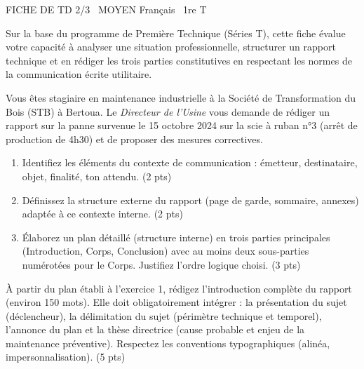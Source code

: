 \documentclass[11pt]{article}
\begin{document}
\begin{tcolorbox}[enhanced,colback=popink,colframe=popink,arc=10pt,boxrule=0pt,left=12pt,right=12pt,top=9pt,bottom=9pt]
{\color{white}\popxbold\small FICHE DE TD 2/3 \textbullet\ MOYEN \hfill Français \textbullet\ 1re T\par}
\end{tcolorbox}
\vspace{4pt}
\noindent Sur la base du programme de Première Technique (Séries T), cette fiche évalue votre capacité à analyser une situation professionnelle, structurer un rapport technique et en rédiger les trois parties constitutives en respectant les normes de la communication écrite utilitaire.

\begin{exercice}
Vous êtes stagiaire en maintenance industrielle à la Société de Transformation du Bois (STB) à Bertoua. Le \textit{Directeur de l'Usine} vous demande de rédiger un rapport sur la panne survenue le 15 octobre 2024 sur la scie à ruban n°3 (arrêt de production de 4h30) et de proposer des mesures correctives.
\begin{enumerate}
    \item Identifiez les éléments du contexte de communication : émetteur, destinataire, objet, finalité, ton attendu. (2 pts)
    \item Définissez la structure externe du rapport (page de garde, sommaire, annexes) adaptée à ce contexte interne. (2 pts)
    \item Élaborez un plan détaillé (structure interne) en trois parties principales (Introduction, Corps, Conclusion) avec au moins deux sous-parties numérotées pour le Corps. Justifiez l'ordre logique choisi. (3 pts)
\end{enumerate}
\end{exercice}

\begin{exercice}
À partir du plan établi à l'exercice 1, rédigez l'introduction complète du rapport (environ 150 mots). Elle doit obligatoirement intégrer : la présentation du sujet (déclencheur), la délimitation du sujet (périmètre technique et temporel), l'annonce du plan et la thèse directrice (cause probable et enjeu de la maintenance préventive). Respectez les conventions typographiques (alinéa, impersonnalisation). (5 pts)
\end{exercice}
\end{document}
